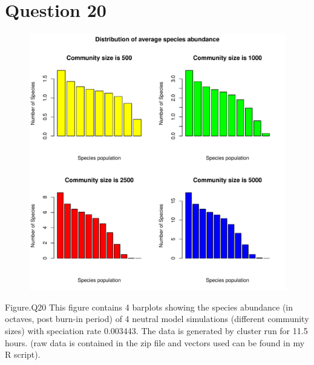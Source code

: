 \documentclass[12pt,a4paper]{article}
\begin{document}
\section{Question 20}
\begin{figure}[h]
\centering
\includegraphics[width=\textwidth]{Q20Plot.pdf}
\end{figure}
Figure.Q20 This figure contains 4 barplots showing the species abundance (in octaves, post burn-in period) of 4 neutral model simulations (different community sizes) 
with speciation rate 0.003443. The data is generated by cluster run for 11.5 hours. (raw data is contained in the zip file and vectors used can be found in my R script).

\newpage
\end{document}
